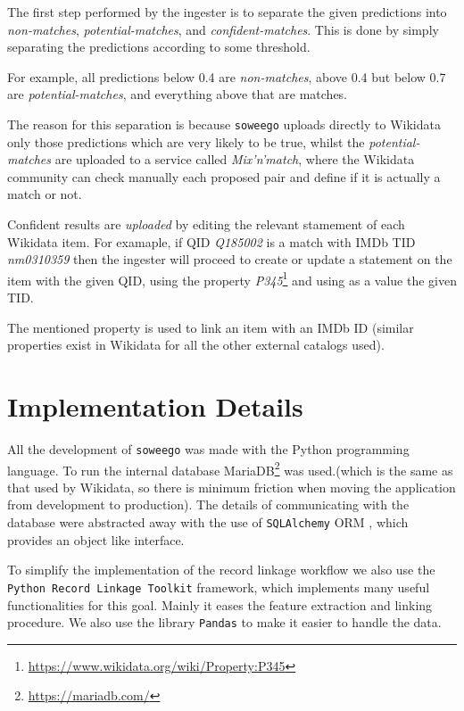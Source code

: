 \documentclass[epsfig,a4paper,11pt,titlepage,twoside,openany]{book}
\newcommand{\footurl}[1]{\footnote{\url{#1}}}
\begin{document}
The first step performed by the ingester is to separate the given predictions into \textit{non-matches}, \textit{potential-matches}, and \textit{confident-matches}. This is done by simply separating the predictions according to some threshold. 

For example, all predictions below 0.4 are \textit{non-matches}, above 0.4 but below 0.7 are \textit{potential-matches}, and everything above that are matches. 

The reason for this separation is because \texttt{soweego} uploads directly to Wikidata only those predictions which are very likely to be true, whilst the \textit{potential-matches} are uploaded to a service called \textit{Mix'n'match}, where the Wikidata community can check manually each proposed pair and define if it is actually a match or not.

Confident results are \textit{uploaded} by editing the relevant stamement of each Wikidata item. For examaple, if QID \textit{Q185002} is a match with IMDb TID \textit{nm0310359} then the ingester will proceed to create or update a statement on the item with the given QID, using the property \textit{P345}\footurl{https://www.wikidata.org/wiki/Property:P345} and using as a value the given TID. 

The mentioned property is used to link an item with an IMDb ID (similar properties exist in Wikidata for all the other external catalogs used).


\section{Implementation Details}
\label{sec:soweego-implementation-details}

All the development of \texttt{soweego} was made with the Python \cite{python-tutorial} programming language. To run the internal database  MariaDB\footurl{https://mariadb.com/} was used.(which is the same as that used by Wikidata, so there is minimum friction when moving the application from development to production). 
The details of communicating with the database were abstracted away with the use of \texttt{SQLAlchemy} ORM \cite{sqlalchemy}, which provides an object like interface.

To simplify the implementation of the record linkage workflow we also use the \texttt{Python Record Linkage Toolkit} \cite{recordlinkage-library} framework, which implements many useful functionalities for this goal. Mainly it eases the feature extraction and linking procedure. We also use the library \texttt{Pandas} \cite{mckinney-proc-scipy-2010} to make it easier to handle the data.
\end{document}
